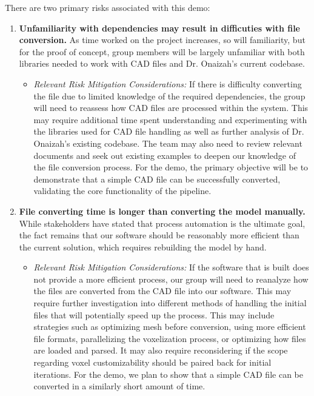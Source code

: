 \documentclass{article}
\begin{document}
There are two primary risks associated with this demo:

\begin{enumerate}
  \item \textbf{Unfamiliarity with dependencies may result in difficuties with file conversion.} As time worked on the project increases, so will familiarity, but for the proof of concept, group members will be largely unfamiliar with both libraries needed to work with CAD files and Dr. Onaizah’s current codebase.
  \begin{itemize}
    \item[] \textit{Relevant Risk Mitigation Considerations:} If there is difficulty converting the file due to limited knowledge of the required dependencies, the group will need to reassess how CAD files are processed within the system. This may require additional time spent understanding and experimenting with the libraries used for CAD file handling as well as further analysis of Dr. Onaizah’s existing codebase. The team may also need to review relevant documents and seek out existing examples to deepen our knowledge of the file conversion process. For the demo, the primary objective will be to demonstrate that a simple CAD file can be successfully converted, validating the core functionality of the pipeline. 
  \end{itemize}
  \item \textbf{File converting time is longer than converting the model manually.} While stakeholders have stated that process automation is the ultimate goal, the fact remains that our software should be reasonably more efficient than the current solution, which requires rebuilding the model by hand.
  \begin{itemize}
    \item[] \textit{Relevant Risk Mitigation Considerations:} If the software that is built does not provide a more efficient process, our group will need to reanalyze how the files are converted from the CAD file into our software. This may require further investigation into different methods of handling the initial files that will potentially speed up the process. This may include strategies such as optimizing mesh before conversion, using more efficient file formats, parallelizing the voxelization process, or optimizing how files are loaded and parsed. It may also require reconsidering if the scope regarding voxel customizability should be paired back for initial iterations. For the demo, we plan to show that a simple CAD file can be converted in a similarly short amount of time.
  \end{itemize}

\end{enumerate}
\end{document}
